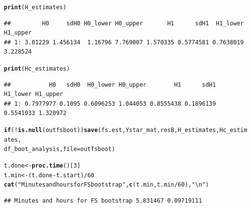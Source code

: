 \documentclass[9pt]{article}\usepackage[]{graphicx}\usepackage[]{xcolor}
\makeatletter
\newcommand{\hlnum}[1]{\textcolor[rgb]{0.686,0.059,0.569}{#1}}%
\newcommand{\hlstr}[1]{\textcolor[rgb]{0.192,0.494,0.8}{#1}}%
\newcommand{\hlopt}[1]{\textcolor[rgb]{0,0,0}{#1}}%
\newcommand{\hlstd}[1]{\textcolor[rgb]{0.345,0.345,0.345}{#1}}%
\newcommand{\hlkwa}[1]{\textcolor[rgb]{0.161,0.373,0.58}{\textbf{#1}}}%
\newcommand{\hlkwb}[1]{\textcolor[rgb]{0.69,0.353,0.396}{#1}}%
\newcommand{\hlkwc}[1]{\textcolor[rgb]{0.333,0.667,0.333}{#1}}%
\newcommand{\hlkwd}[1]{\textcolor[rgb]{0.737,0.353,0.396}{\textbf{#1}}}%
\newenvironment{kframe}{%
 \def\at@end@of@kframe{}%
 \ifinner\ifhmode%
  \def\at@end@of@kframe{\end{minipage}}%
  \begin{minipage}{\columnwidth}%
 \fi\fi%
 \def\FrameCommand##1{\hskip\@totalleftmargin \hskip-\fboxsep
 \colorbox{shadecolor}{##1}\hskip-\fboxsep
     \hskip-\linewidth \hskip-\@totalleftmargin \hskip\columnwidth}%
 \MakeFramed {\advance\hsize-\width
   \@totalleftmargin\z@ \linewidth\hsize
   \@setminipage}}%
 {\par\unskip\endMakeFramed%
 \at@end@of@kframe}
\newenvironment{knitrout}{}{} %
\theoremstyle{definition}
\theoremstyle{remark}
\makeatother
\begin{document}
\begin{knitrout}
\begin{kframe}
\begin{alltt}
\hlkwd{print}\hlstd{(H_estimates)}
\end{alltt}
\begin{verbatim}
##         H0     sdH0 H0_lower H0_upper       H1      sdH1  H1_lower H1_upper
## 1: 3.01229 1.456134  1.16796 7.769007 1.570335 0.5774581 0.7638019 3.228524
\end{verbatim}
\begin{alltt}
\hlkwd{print}\hlstd{(Hc_estimates)}
\end{alltt}
\begin{verbatim}
##           H0   sdH0  H0_lower H0_upper        H1      sdH1  H1_lower H1_upper
## 1: 0.7977977 0.1095 0.6096253 1.044053 0.8555438 0.1896139 0.5541033 1.320972
\end{verbatim}
\begin{alltt}
\hlkwa{if} \hlstd{(}\hlopt{!}\hlkwd{is.null}\hlstd{(outfsboot))} \hlkwd{save}\hlstd{(fs.est, Ystar_mat, resB, H_estimates, Hc_estimates,}
    \hlstd{df_boot_analysis,} \hlkwc{file} \hlstd{= outfsboot)}
\end{alltt}
\end{kframe}
\end{knitrout}


\begin{knitrout}
\color{fgcolor}\begin{kframe}
\begin{alltt}
\hlstd{t.done} \hlkwb{<-} \hlkwd{proc.time}\hlstd{()[}\hlnum{3}\hlstd{]}
\hlstd{t.min} \hlkwb{<-} \hlstd{(t.done} \hlopt{-} \hlstd{t.start)}\hlopt{/}\hlnum{60}
\hlkwd{cat}\hlstd{(}\hlstr{"Minutes and hours for FS bootstrap"}\hlstd{,} \hlkwd{c}\hlstd{(t.min, t.min}\hlopt{/}\hlnum{60}\hlstd{),} \hlstr{"\textbackslash{}n"}\hlstd{)}
\end{alltt}
\begin{verbatim}
## Minutes and hours for FS bootstrap 5.831467 0.09719111
\end{verbatim}
\end{kframe}
\end{knitrout}
\end{document}

